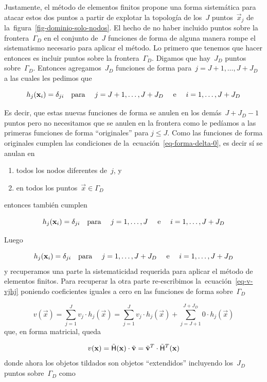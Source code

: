 \documentclass[
  12pt,
  a4paper,
  table]{scrbook}
\providecommand{\tightlist}{%
  \setlength{\itemsep}{0pt}\setlength{\parskip}{0pt}}\usepackage{longtable,booktabs,array}
\theoremstyle{plain}
\theoremstyle{definition}
\theoremstyle{plain}
\theoremstyle{plain}
\theoremstyle{remark}
\begin{document}
Justamente, el método de elementos finitos propone una forma sistemática
para atacar estos dos puntos a partir de explotar la topología de
los~\(J\) puntos~\(\vec{x}_j\) de
la~figura~\ref{fig-dominio-solo-nodos}. El hecho de no haber incluido
puntos sobre la frontera~\(\Gamma_D\) en el conjunto de~\(J\) funciones
de forma de alguna manera rompe el sistematismo necesario para aplicar
el método. Lo primero que tenemos que hacer entonces es incluir puntos
sobre la frontera~\(\Gamma_D\). Digamos que hay~\(J_D\) puntos
sobre~\(\Gamma_D\). Entonces agregamos~\(J_D\) funciones de forma
para~\(j=J+1,\dots,J+J_D\) a las cuales les pedimos que

\[
h_j(\vec{x}_i) = \delta_{ji} \quad \text{para \quad $j=J+1,\dots,J+J_D$ \quad e \quad $i=1,\dots,J+J_D$}\\
\]

Es decir, que estas nuevas funciones de forma se anulen en los
demás~\(J+J_D-1\) puntos pero no necesitamos que se anulen en la
frontera como le pedíamos a las primeras funciones de forma
``originales'' para \(j \leq J\). Como las funciones de forma originales
cumplen las condiciones de la~ecuación~\ref{eq-forma-delta-0}, es decir
sí se anulan en

\begin{enumerate}
\def\labelenumi{\alph{enumi}.}
\tightlist
\item
  todos los nodos diferentes de~\(j\), y
\item
  en todos los puntos~\(\vec{x} \in \Gamma_D\)
\end{enumerate}

entonces también cumplen

\[
h_j(\vec{x}_i) = \delta_{ji} \quad \text{para \quad $j=1,\dots,J$ \quad e \quad $i=1,\dots,J+J_D$}\\
\]

Luego

\[
h_j(\vec{x}_i) = \delta_{ji} \quad \text{para \quad $j=1,\dots,J+J_D$ \quad e \quad $i=1,\dots,J+J_D$}\\
\] y recuperamos una parte la sistematicidad requerida para aplicar el
método de elementos finitos. Para recuperar la otra parte re-escribimos
la~ecuación~\ref{eq-v-vjhj} poniendo coeficientes iguales a cero en las
funciones de forma sobre~\(\Gamma_D\)

\[
v(\vec{x}) = \sum_{j=1}^J v_j \cdot h_j(\vec{x}) =
\sum_{j=1}^J v_j \cdot h_j(\vec{x}) + \sum_{j=J+1}^{J+J_D} 0 \cdot h_j(\vec{x})
\] que, en forma matricial, queda

\[
v(\vec{x}) = \tilde{\mat{H}}(\vec{x}) \cdot \tilde{\vec{v}} = \tilde{\vec{v}}^T \cdot \tilde{\mat{H}}^T(\vec{x})
\] donde ahora los objetos tildados son objetos ``extendidos''
incluyendo los~\(J_D\) puntos sobre~\(\Gamma_D\) como
\end{document}
